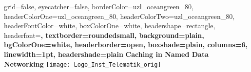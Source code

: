 \documentclass[a0paper,portrait]{baposter}
\begin{document}



\background{
}

\begin{poster}{
		grid=false,
		eyecatcher=false,
		borderColor=uzl_oceangreen_80,
		headerColorOne=uzl_oceangreen_80,
		headerColorTwo=uzl_oceangreen_80,
		headerFontColor=white,
		boxColorOne=white,
		headershape=rectangle,
		headerfont=\large\bf,
		textborder=roundedsmall,
		background=plain,
		bgColorOne=white,
		headerborder=open,
		boxshade=plain,
		columns=6,
		linewidth=1pt,
		headershade=plain
	}
	{
	}
	{
		\vspace{0.3cm}
		\textcolor{uzl_oceangreen_80}{\textbf{Caching in Named Data Networking}}
		\vspace{0.3cm}
	}
	{
		\textcolor{uzl_orange_2}{\textsf{}}
	}
	{
		\hspace{1cm}
		\texttt{[image: Logo\_Inst\_Telematik\_orig]}
	}





\end{poster}
\end{document}
